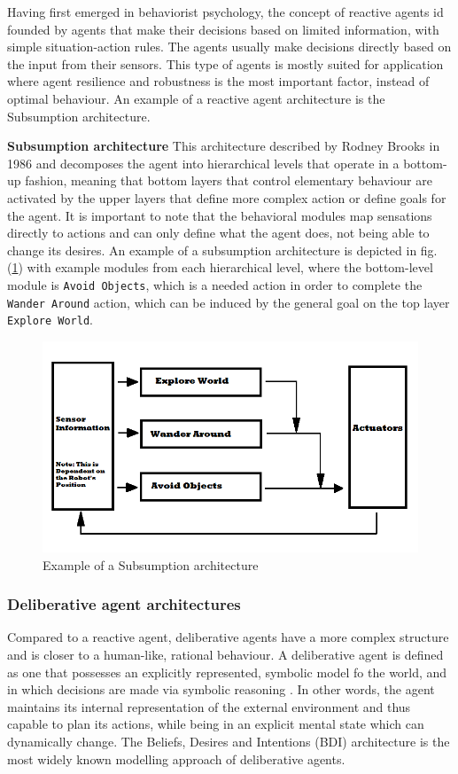\documentclass[main.tex]{subfiles}
\begin{document}
Having first emerged in behaviorist psychology, the concept of reactive agents id founded by agents
that make their decisions based on limited information, with simple situation-action rules. The agents
usually make decisions directly based on the input from their sensors. This type of agents is mostly
suited for application where agent resilience and robustness is the most important factor, instead
of optimal behaviour. An example of a reactive agent architecture is the Subsumption architecture.

\textbf{Subsumption architecture}\newline
This architecture described by Rodney Brooks in 1986 \cite{1087032} and
decomposes the agent into hierarchical levels that operate in a bottom-up
fashion, meaning that bottom layers that control elementary behaviour are
activated by the upper layers that define more complex action or define goals for
the agent. It is important to note that the behavioral modules map sensations
directly to actions and can only define what the agent does, not being able to
change its desires. An example of a subsumption architecture is depicted in fig.
(\ref{Subsumption}) with example modules from each hierarchical level, where the
bottom-level module is \texttt{Avoid Objects}, which is a needed action in order
to complete the \texttt{Wander Around} action, which can be induced by the
general goal on the top layer \texttt{Explore World}.

\begin{figure}[htbp]
    \centering
    \includegraphics[width = .6\textwidth]{Subsumption_Architecture_Abstract_Diagram.png}
    \caption{Example of a Subsumption architecture \cite{Brooks1999}}
    \label{Subsumption}
\end{figure}

\subsubsection{Deliberative agent architectures}

Compared to a reactive agent, deliberative agents have a more complex structure and is closer to a
human-like, rational behaviour. A deliberative agent is defined as one that
possesses an explicitly represented, symbolic model fo the world, and in which
decisions are made via symbolic reasoning \cite{Wooldridge1996}. In other words,
the agent maintains its internal representation of the external environment and
thus capable to plan its actions, while being in an explicit mental state which
can dynamically change. The Beliefs, Desires and Intentions (BDI) architecture
is the most widely known modelling approach of deliberative agents.
\end{document}
